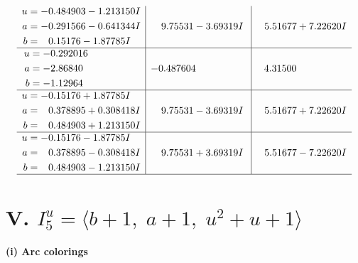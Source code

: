 \documentclass[1p]{elsarticle_modified}
\theoremstyle{definition}
\begin{document}
$$\begin{array}{c|c|c}
\begin{aligned}
u &= -0.484903 - 1.213150 I \\
a &= -0.291566 - 0.641344 I \\
b &= \phantom{-}0.15176 - 1.87785 I\end{aligned}
 & \phantom{-}9.75531 - 3.69319 I & \phantom{-}5.51677 + 7.22620 I \\ \hline\begin{aligned}
u &= -0.292016\phantom{ +0.000000I} \\
a &= -2.86840\phantom{ +0.000000I} \\
b &= -1.12964\phantom{ +0.000000I}\end{aligned}
 & -0.487604\phantom{ +0.000000I} & \phantom{-}4.31500\phantom{ +0.000000I} \\ \hline\begin{aligned}
u &= -0.15176 + 1.87785 I \\
a &= \phantom{-}0.378895 + 0.308418 I \\
b &= \phantom{-}0.484903 + 1.213150 I\end{aligned}
 & \phantom{-}9.75531 - 3.69319 I & \phantom{-}5.51677 + 7.22620 I \\ \hline\begin{aligned}
u &= -0.15176 - 1.87785 I \\
a &= \phantom{-}0.378895 - 0.308418 I \\
b &= \phantom{-}0.484903 - 1.213150 I\end{aligned}
 & \phantom{-}9.75531 + 3.69319 I & \phantom{-}5.51677 - 7.22620 I\\
 \hline 
 \end{array}$$\newpage\newpage\renewcommand{\arraystretch}{1}
\centering \section*{V. $I^u_{5}= \langle b+1,\;a+1,\;u^2+u+1 \rangle$}
\flushleft \textbf{(i) Arc colorings}\\
\end{document}
